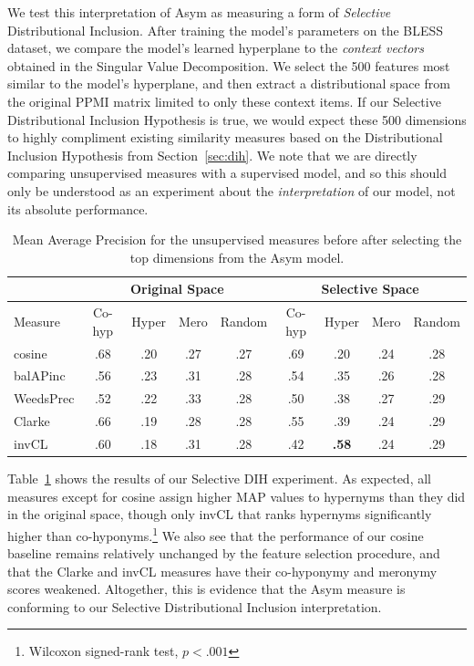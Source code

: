 We test this interpretation of Asym as measuring a form of {\em Selective}
Distributional Inclusion. After training the model's parameters on the BLESS
dataset, we compare the model's learned hyperplane to the {\em context vectors}
obtained in the Singular Value Decomposition. We select the 500 features most
similar to the model's hyperplane, and then extract a distributional space from
the original PPMI matrix limited to only these context items.  If our Selective
Distributional Inclusion Hypothesis is true, we would expect these 500
dimensions to highly compliment existing similarity measures based on the
Distributional Inclusion Hypothesis from Section~\ref{sec:dih}. We note
that we are directly comparing unsupervised measures with a supervised model,
and so this should only be understood as an experiment about the {\em
interpretation} of our model, not its absolute performance.

\begin{table}
  \centering
  \begin{small}
  \begin{tabular}{|l|cccc||cccc|}
    \hline
    & \multicolumn{4}{c||}{Original Space} & \multicolumn{4}{|c|}{Selective Space}\\
    \hline\hline
    Measure        & Co-hyp  & Hyper  & Mero  & Random  & Co-hyp  &   Hyper  & Mero & Random \\
    \hline
    cosine         &   .68   &   .20  &  .27  &    .27  &    .69  &     .20  &  .24 &    .28 \\
    balAPinc       &   .56   &   .23  &  .31  &    .28  &    .54  &     .35  &  .26 &    .28 \\
    WeedsPrec      &   .52   &   .22  &  .33  &    .28  &    .50  &     .38  &  .27 &    .29 \\
    Clarke         &   .66   &   .19  &  .28  &    .28  &    .55  &     .39  &  .24 &    .29 \\
    invCL          &   .60   &   .18  &  .31  &    .28  &    .42  & {\bf.58} &  .24 &    .29 \\
    \hline
  \end{tabular}
  \end{small}
  \caption{Mean Average Precision for the unsupervised measures before
  after selecting the top dimensions from the Asym model.}
  \label{tab:mapscores2}
\end{table}

Table~\ref{tab:mapscores2} shows the results of our Selective DIH experiment.
As expected, all measures except for cosine assign higher MAP values to
hypernyms than they did in the original space, though only invCL that ranks
hypernyms significantly higher than co-hyponyms.\footnote{Wilcoxon signed-rank
test, $p < .001$} We also see that the performance of our cosine baseline
remains relatively unchanged by the feature selection procedure, and that
the Clarke and invCL measures have their co-hyponymy and meronymy
scores weakened. Altogether, this is evidence that the Asym measure is
conforming to our Selective Distributional Inclusion interpretation.

